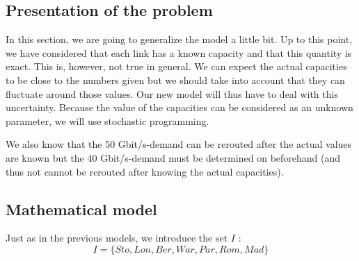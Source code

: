 \subsection{Presentation of the problem}
In this section, we are going to generalize the model a little bit. Up to this point, we have considered that each link has a known capacity and that this quantity is exact. This is, however, not true in general. We can expect the actual capacities to be close to the numbers given but we should take into account that they can fluctuate around those values. Our new model will thus have to deal with this uncertainty. Because the value of the capacities can be considered as an unknown parameter, we will use stochastic programming.

We also know that the 50 Gbit/s-demand can be rerouted after the actual values are known but the 40 Gbit/s-demand must be determined on beforehand (and thus not cannot be rerouted after knowing the actual capacities).

\subsection{Mathematical model}
Just as in the previous models, we introduce the set $I$ :
$$I = \{ Sto,Lon,Ber,War,Par,Rom,Mad\}$$


 